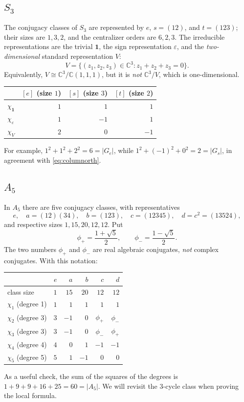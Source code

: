 \documentclass[12pt]{article}
\theoremstyle{remark}
\newcommand{\C}{\mathbb C}
\newcommand{\id}{\mathbf 1}
\newcommand{\eps}{\varepsilon}
\begin{document}
\subsection{$S_3$}
The conjugacy classes of $S_3$ are represented by
$e$, $s=(12)$, and $t=(123)$; their sizes are $1,3,2$, and the
centralizer orders are $6,2,3$.  The irreducible representations are
the trivial $\id$, the sign representation $\eps$, and the
\emph{two-dimensional} standard representation $V$:
\[
 V=\{(z_1,z_2,z_3)\in\C^3:z_1+z_2+z_3=0\}.
\]
Equivalently, $V\cong\C^3/\C(1,1,1)$, but it is \emph{not}
$\C^3/V$, which is one-dimensional.
\begin{center}
\begin{tabular}{lrrr}
\toprule
 & $[e]$ (size $1$) & $[s]$ (size $3$) & $[t]$ (size $2$)\\
\midrule
$\chi_{\id}$ & $1$&$1$&$1$\\
$\chi_{\eps}$ & $1$&$-1$&$1$\\
$\chi_V$ & $2$&$0$&$-1$\\
\bottomrule
\end{tabular}
\end{center}
For example, $1^2+1^2+2^2=6=|G_e|$, while
$1^2+(-1)^2+0^2=2=|G_s|$, in agreement with
\eqref{eq:columnorth}.

\subsection{$A_5$}
In $A_5$ there are five conjugacy classes, with representatives
\[
 e,\quad a=(12)(34),\quad b=(123),\quad
 c=(12345),\quad d=c^2=(13524),
\]
and respective sizes $1,15,20,12,12$. Put
\[
 \phi_+=\frac{1+\sqrt5}{2},\qquad
 \phi_-=\frac{1-\sqrt5}{2}.
\]
The two numbers $\phi_+$ and $\phi_-$ are real algebraic
conjugates, \emph{not} complex conjugates.  With this notation:
\begin{center}
\begin{tabular}{lrrrrr}
\toprule
 & $e$ & $a$ & $b$ & $c$ & $d$\\
\midrule
class size & $1$&$15$&$20$&$12$&$12$\\
$\chi_1$ (degree 1) & $1$&$1$&$1$&$1$&$1$\\
$\chi_2$ (degree 3) & $3$&$-1$&$0$&$\phi_+$&$\phi_-$\\
$\chi_3$ (degree 3) & $3$&$-1$&$0$&$\phi_-$&$\phi_+$\\
$\chi_4$ (degree 4) & $4$&$0$&$1$&$-1$&$-1$\\
$\chi_5$ (degree 5) & $5$&$1$&$-1$&$0$&$0$\\
\bottomrule
\end{tabular}
\end{center}
As a useful check, the sum of the squares of the degrees is
$1+9+9+16+25=60=|A_5|$.  We will revisit the $3$-cycle class
when proving the local formula.
\end{document}

